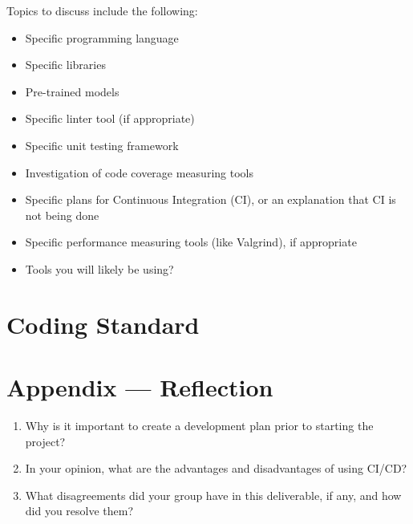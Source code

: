 \documentclass{article}
\begin{document}

Topics to discuss include the following:

\begin{itemize}
\item Specific programming language
\item Specific libraries
\item Pre-trained models
\item Specific linter tool (if appropriate)
\item Specific unit testing framework
\item Investigation of code coverage measuring tools
\item Specific plans for Continuous Integration (CI), or an explanation that CI
  is not being done
\item Specific performance measuring tools (like Valgrind), if
  appropriate
\item Tools you will likely be using?
\end{itemize}


\section{Coding Standard}


\newpage{}

\section*{Appendix --- Reflection}




\begin{enumerate}
    \item Why is it important to create a development plan prior to starting the
    project?
    \item In your opinion, what are the advantages and disadvantages of using
    CI/CD?
    \item What disagreements did your group have in this deliverable, if any,
    and how did you resolve them?
\end{enumerate}
\end{document}
